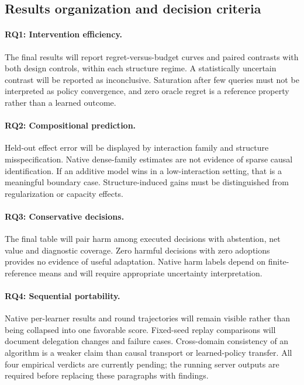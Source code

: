 \documentclass[runningheads]{llncs}
\begin{document}
\subsection{Results organization and decision criteria}
\paragraph{RQ1: Intervention efficiency.}
The final results will report regret-versus-budget curves and paired contrasts with both design controls, within each structure regime. A statistically uncertain contrast will be reported as inconclusive. Saturation after few queries must not be interpreted as policy convergence, and zero oracle regret is a reference property rather than a learned outcome.
\paragraph{RQ2: Compositional prediction.}
Held-out effect error will be displayed by interaction family and structure misspecification. Native dense-family estimates are not evidence of sparse causal identification. If an additive model wins in a low-interaction setting, that is a meaningful boundary case. Structure-induced gains must be distinguished from regularization or capacity effects.
\paragraph{RQ3: Conservative decisions.}
The final table will pair harm among executed decisions with abstention, net value and diagnostic coverage. Zero harmful decisions with zero adoptions provides no evidence of useful adaptation. Native harm labels depend on finite-reference means and will require appropriate uncertainty interpretation.
\paragraph{RQ4: Sequential portability.}
Native per-learner results and round trajectories will remain visible rather than being collapsed into one favorable score. Fixed-seed replay comparisons will document delegation changes and failure cases. Cross-domain consistency of an algorithm is a weaker claim than causal transport or learned-policy transfer. All four empirical verdicts are currently pending; the running server outputs are required before replacing these paragraphs with findings.


\end{document}
